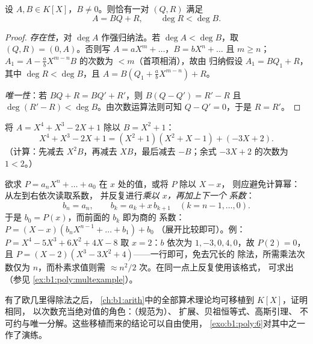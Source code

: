 \begin{theorem}[欧几里得除法]\label{thm:b1:poly:division}
设 $A, B \in K[X]$，$B \neq 0$。则恰有一对 $(Q,
R)$ 满足
\[
A = BQ + R, \qquad \deg R < \deg B .
\]
\end{theorem}

\begin{proof}
\emph{存在性}，对 $\deg A$ 作强归纳法。若 $\deg A < \deg
B$，取 $(Q, R) = (0, A)$。否则写 $A = a X^m + \dots$，$B =
b X^n + \dots$ 且 $m \geq n$； $A_1 = A - \frac ab
X^{m-n} B$ 的次数为 $< m$（首项相消），故由
归纳假设 $A_1 = BQ_1 + R$，其中 $\deg R < \deg B$，且 $A = B(Q_1 +
\frac ab X^{m-n}) + R$。

\emph{唯一性}：若 $BQ + R = BQ' + R'$，则 $B(Q - Q') = R' - R$
且 $\deg(R' - R) < \deg B$。由次数运算法则可知 $Q - Q'
= 0$，于是 $R = R'$。
\end{proof}

\begin{example}\label{ex:b1:poly:division}
将 $A = X^4 + X^3 - 2X + 1$ 除以 $B = X^2 + 1$：
\[
X^4 + X^3 - 2X + 1 = (X^2 + 1)(X^2 + X - 1) + (-3X + 2).
\]
（计算：先减去 $X^2 B$，再减去 $X B$，最后减去 $-B$；余式
$-3X + 2$ 的次数为 $1 < 2$。）
\end{example}

\begin{method}[霍纳法]\label{met:b1:poly:horner}
欲求 $P = a_nX^n + \dots + a_0$ 在 $x$ 处的值，或将 $P$ 除以 $X - x$，
则应避免计算幂：从左到右依次读取系数，
并反复进行\emph{乘以 $x$，再加上下一个
系数}：
\[
b_n = a_n, \qquad b_{k} = a_{k} + x\,b_{k+1}
\quad (k = n-1, \dots, 0) .
\]
于是 $b_0 = P(x)$，而前面的 $b_k$ 即为商的
系数：$P = (X - x)(b_nX^{n-1} + \dots + b_1) + b_0$
（展开比较即可）。例：$P = X^4 - 5X^3 + 6X^2 + 4X - 8$
取 $x = 2$：$b$ 依次为 $1, -3, 0, 4, 0$，故 $P(2) = 0$，且 $P
= (X-2)(X^3 - 3X^2 + 4)$——一行即可，免去冗长的
除法，所需乘法次数仅为 $n$，而朴素求值则需 $\approx n^2/2$
次。在同一点上反复使用该格式，
可求出（参见
\cref{ex:b1:poly:multexample}）。
\end{method}

\begin{remark}[{$K[X]$ 的算术}]
有了欧几里得除法之后，
\cref{ch:b1:arith}中的全部算术理论均可移植到 $K[X]$，证明相同，
以次数充当绝对值的角色：（规范为）、
扩展、贝祖恒等式、高斯引理、
不可约与唯一分解。这些移植而来的结论可以自由使用，
\cref{exo:b1:poly:6}对其中之一作了演练。
\end{remark}

